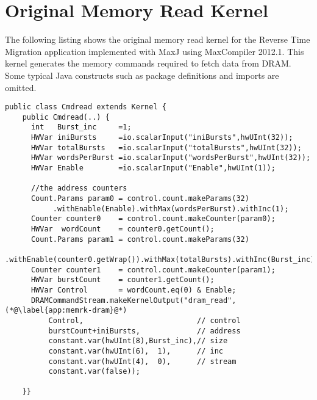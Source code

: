\chapter{Original Memory Read Kernel}
\label{app:mem-read-kernel}
The following listing shows the original memory read kernel for the
Reverse Time Migration application implemented with MaxJ using
MaxCompiler 2012.1. This kernel generates the memory commands required
to fetch data from DRAM. Some typical Java constructs such as package
definitions and imports are omitted.
\begin{lstlisting}
public class Cmdread extends Kernel {
    public Cmdread(..) {
      int   Burst_inc     =1;
      HWVar iniBursts     =io.scalarInput("iniBursts",hwUInt(32));
      HWVar totalBursts   =io.scalarInput("totalBursts",hwUInt(32));
      HWVar wordsPerBurst =io.scalarInput("wordsPerBurst",hwUInt(32));
      HWVar Enable        =io.scalarInput("Enable",hwUInt(1));

      //the address counters
      Count.Params param0 = control.count.makeParams(32)
           .withEnable(Enable).withMax(wordsPerBurst).withInc(1);
      Counter counter0    = control.count.makeCounter(param0);
      HWVar  wordCount    = counter0.getCount();
      Count.Params param1 = control.count.makeParams(32)
           .withEnable(counter0.getWrap()).withMax(totalBursts).withInc(Burst_inc);
      Counter counter1    = control.count.makeCounter(param1);
      HWVar burstCount    = counter1.getCount();
      HWVar Control       = wordCount.eq(0) & Enable;
      DRAMCommandStream.makeKernelOutput("dram_read", (*@\label{app:memrk-dram}@*)
          Control,                          // control
          burstCount+iniBursts,             // address
          constant.var(hwUInt(8),Burst_inc),// size
          constant.var(hwUInt(6),  1),      // inc
          constant.var(hwUInt(4),  0),      // stream
          constant.var(false));

    }}
\end{lstlisting}